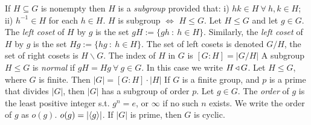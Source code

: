  If $H \subseteq G$ is nonempty then $H$ is a \textit{subgroup} provided that: i) $hk \in H\ \forall\ h, k \in H$; ii) $h^{-1} \in H$ for each $h \in H$. $H$ is subgroup $\Leftrightarrow$ $H \le G$.
 Let $H \le G$ and let $g \in G$. The \textit{left coset} of $H$ by $g$ is the set $gH := \{gh\ :\ h \in H\}$. Similarly, the \textit{left coset} of $H$ by $g$ is the set $Hg := \{hg\ :\ h \in H\}$. The set of left cosets is denoted $G/H$, the set of right cosets is $H\backslash G$. The index of $H$ in $G$ is $[G : H] = |G/H|$
 A subgroup $H \le G$ is \textit{normal} if $gH = Hg\ \forall\ g \in G$. In this case we write $H \operatorname{\triangleleft} G$.
 Let $H \le G$, where $G$ is finite. Then $|G| = [G:H] \cdot |H|$
 If $G$ is a finite group, and $p$ is a prime that divides $|G|$, then $|G|$ has a subgroup of order $p$.
 Let $g \in G$. The \textit{order} of $g$ is the least positive integer s.t. $g^n=e$, or $\infty$ if no such $n$ exists. We write the order of $g$ as $o(g)$. $o(g) = |\langle g \rangle|$.
 If $|G|$ is prime, then $G$ is cyclic.